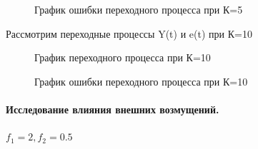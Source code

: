 \documentclass[a4paper, 11pt]{article}
\begin{document}
\begin{figure}[h!]
    \caption{График ошибки переходного процесса при К=5}
    \label{tree}
\end{figure}

\newpage

Рассмотрим переходные процессы Y(t) и e(t) при К=10

\begin{figure}[h!]
    \caption{График переходного процесса при К=10}
    \label{two}
\end{figure}

\begin{figure}[h!]
    \caption{График ошибки переходного процесса при К=10}
    \label{tree}
\end{figure}

\newpage
\paragraph{Исследование влияния внешних возмущений.\\} $f_1=2,  f_2=0.5$
\end{document}
